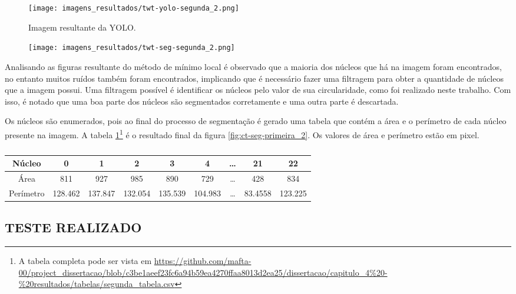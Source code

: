 \begin{figure}[!h]
    \centering
    \texttt{[image: imagens\_resultados/twt-yolo-segunda\_2.png]}
    \caption{Imagem resultante da YOLO.}
    \label{fig:twt-yolo-segunda_2}
\end{figure}

\begin{figure}[!h]
    \centering
    \texttt{[image: imagens\_resultados/twt-seg-segunda\_2.png]}
    \caption{}
    \label{fig:twt-seg-segunda_2}
\end{figure}

Analisando as figuras resultante do método de mínimo local é observado que a maioria dos núcleos que há na imagem foram encontrados, no entanto muitos ruídos também foram encontrados, implicando que é necessário fazer uma filtragem para obter a quantidade de núcleos que a imagem possui. Uma filtragem possível é identificar os núcleos pelo valor de sua circularidade, como foi realizado neste trabalho. Com isso, é notado que uma boa parte dos núcleos são segmentados corretamente e uma outra parte é descartada.

Os núcleos são enumerados, pois ao final do processo de segmentação é gerado uma tabela que contém a área e o perímetro de cada núcleo presente na imagem. A tabela \ref{tab:resultados-segundo-metodo}\footnote{A tabela completa pode ser vista em \url{https://github.com/mafta-00/project_dissertacao/blob/c3be1aeef23fc6a94b59ea4270ffaa8013d2ea25/dissertacao/capitulo_4\%20-\%20resultados/tabelas/segunda_tabela.csv}} é o resultado final da figura \ref{fig:ct-seg-primeira_2}. Os valores de área e perímetro estão em pixel.

\begin{table}[h]
    \centering
    \caption{}
    \begin{tabular}{c|c|c|c|c|c|c|c|c}
        \hline
        Núcleo    &  0 & 1 & 2 & 3 & 4 & \dots & 21 & 22\\
        \hline    
        Área      &  811 & 927 & 985 & 890 & 729 & \dots & 428 & 834 \\
        \hline  
        Perímetro & 128.462 & 137.847 & 132.054 & 135.539 & 104.983 & \dots & 83.4558 & 123.225 \\
        \hline
    \end{tabular}
    \label{tab:resultados-segundo-metodo}
\end{table}

\subsection{TESTE REALIZADO}

